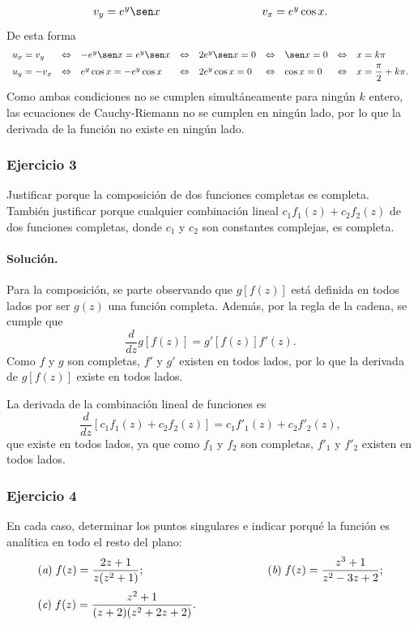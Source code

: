 \documentclass[a4paper]{report}
\begin{document}
\begin{enumerate}
\[\begin{array}{ll}
  v_y=e^y\sen x\qquad\qquad\qquad\qquad&v_x=e^y\cos x.
 \end{array}
 \]
 De esta forma
 \[
 \begin{array}{lllllllll}
  u_x=v_y&\Leftrightarrow&-e^y\sen x=e^y\sen x&\Leftrightarrow&2e^y\sen x=0&\Leftrightarrow&\sen x=0&\Leftrightarrow&x=k\pi\\[\smallskipamount]
  u_y=-v_x&\Leftrightarrow&e^y\cos x=-e^y\cos x&\Leftrightarrow&2e^y\cos x=0&\Leftrightarrow&\cos x=0&\Leftrightarrow&x=\dfrac{\pi}{2}+k\pi.
 \end{array}
 \] 
 Como ambas condiciones no se cumplen simultáneamente para ningún \(k\) entero, las ecuaciones de Cauchy-Riemann no se cumplen en ningún lado, por lo que la derivada de la función no existe en ningún lado. 
\end{enumerate}

\subsubsection{Ejercicio 3}

Justificar porque la composición de dos funciones completas es completa. También justificar porque cualquier combinación lineal \(c_1f_1(z)+c_2f_2(z)\) de dos funciones completas, donde \(c_1\) y \(c_2\) son constantes complejas, es completa.

\paragraph{Solución.} Para la composición, se parte observando que \(g[f(z)]\) está definida en todos lados por ser \(g(z)\) una función completa. Además, por la regla de la cadena, se cumple que
\[
 \frac{d}{dz}g[f(z)]=g'[f(z)]f'(z).
\]
Como \(f\) y \(g\) son completas, \(f'\) y \(g'\) existen en todos lados, por lo que la derivada de \(g[f(z)]\) existe en todos lados.

La derivada de la combinación lineal de funciones es 
\[
 \frac{d}{dz}[c_1f_1(z)+c_2f_2(z)]=c_1f'_1(z)+c_2f'_2(z),
\]
que existe en todos lados, ya que como \(f_1\) y \(f_2\) son completas, \(f'_1\) y \(f'_2\) existen en todos lados. 

\subsubsection{Ejercicio 4}

En cada caso, determinar los puntos singulares e indicar porqué la función es analítica en todo el resto del plano:
\[
 \begin{array}{ll}
  (\textit{a})\;f(z)=\dfrac{2z+1}{z(z^2+1)};\qquad\qquad\qquad\qquad\qquad&(\textit{b})\;f(z)=\dfrac{z^3+1}{z^2-3z+2};\\[\bigskipamount]
  (\textit{c})\;f(z)=\dfrac{z^2+1}{(z+2)(z^2+2z+2)}.
 \end{array}
\]
\end{document}
